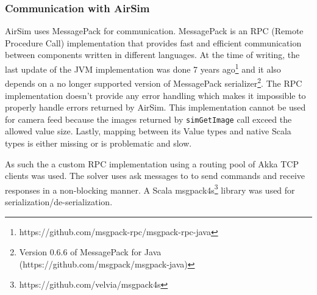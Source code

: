 \documentclass{article}
\begin{document}
\subsubsection{Communication with AirSim}
AirSim uses MessagePack \cite{messagepack} for communication. MessagePack is an RPC (Remote Procedure Call) implementation that provides fast and efficient communication between components written in different languages. At the time of writing, the last update of the JVM implementation was done 7 years ago\footnote{https://github.com/msgpack-rpc/msgpack-rpc-java} and it also depends on a no longer supported version of MessagePack serializer\footnote{Version 0.6.6 of MessagePack for Java (https://github.com/msgpack/msgpack-java)}. The RPC implementation doesn't provide any error handling which makes it impossible to properly handle errors returned by AirSim. This implementation cannot be used for camera feed because the images returned by \verb|simGetImage| call exceed the allowed value size. Lastly, mapping between its Value types and native Scala types is either missing or is problematic and slow.  

As such the a custom RPC implementation using a routing pool of Akka TCP clients was used. The solver uses ask messages to to send commands and receive responses in a non-blocking manner. A Scala msgpack4s\footnote{https://github.com/velvia/msgpack4s} library was used for serialization/de-serialization.


\end{document}
